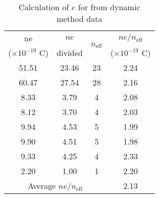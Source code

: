 \begin{table}[H]
    \centering
    \begin{tabular}{|ccc|c|}
    \hline
    \multicolumn{1}{|c|}{ne} & \multicolumn{1}{c|}{$ne$} & \multirow{2}{*}{$n_\text{eff}$} & $ne/n_\text{eff}$ \\ 
    \multicolumn{1}{|c|}{($\times   10^{-19}$ C)} & \multicolumn{1}{c|}{divided} &  & ($\times 10^{-19}$ C) \\ \hline
    \multicolumn{1}{|c|}{51.51} & \multicolumn{1}{c|}{23.46} & 23 & 2.24 \\ \hline
    \multicolumn{1}{|c|}{60.47} & \multicolumn{1}{c|}{27.54} & 28 & 2.16 \\ \hline
    \multicolumn{1}{|c|}{8.33} & \multicolumn{1}{c|}{3.79} & 4 & 2.08 \\ \hline
    \multicolumn{1}{|c|}{8.12} & \multicolumn{1}{c|}{3.70} & 4 & 2.03 \\ \hline
    \multicolumn{1}{|c|}{9.94} & \multicolumn{1}{c|}{4.53} & 5 & 1.99 \\ \hline
    \multicolumn{1}{|c|}{9.90} & \multicolumn{1}{c|}{4.51} & 5 & 1.98 \\ \hline
    \multicolumn{1}{|c|}{9.33} & \multicolumn{1}{c|}{4.25} & 4 & 2.33 \\ \hline
    \multicolumn{1}{|c|}{2.20} & \multicolumn{1}{c|}{1.00} & 1 & 2.20 \\ \hline
    \multicolumn{3}{|c|}{Average $ne/n_\text{eff}$} & 2.13 \\ \hline
    \end{tabular}
    \caption{Calculation of $e$ for from dynamic method data}
\end{table}

